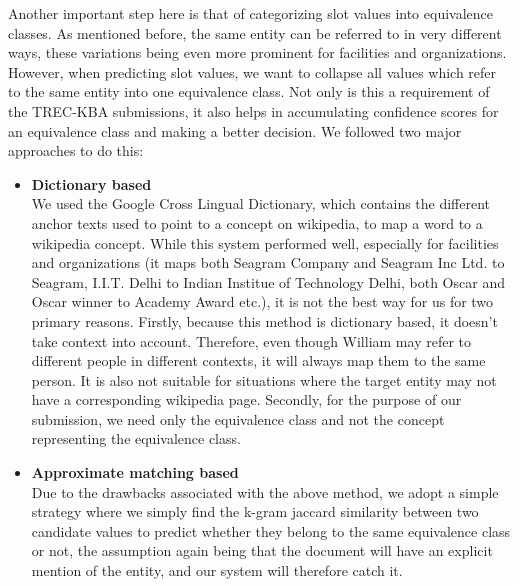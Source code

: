 Another important step here is that of categorizing slot values into equivalence classes. As mentioned before, the same entity can be referred to in very different ways, these variations being even more prominent for facilities and organizations. However, when predicting slot values, we want to collapse all values which refer to the same entity into one equivalence class. Not only is this a requirement of the TREC-KBA submissions, it also helps in accumulating confidence scores for an equivalence class and making a better decision. We followed two major approaches to do this:
\begin{itemize}
\item \textbf{Dictionary based}\\
We used the Google Cross Lingual Dictionary, which contains the different anchor texts used to point to a concept on wikipedia, to map a word to a wikipedia concept. While this system performed well, especially for facilities and organizations (it maps both Seagram Company and Seagram Inc Ltd. to Seagram, I.I.T. Delhi to Indian Institue of Technology Delhi, both Oscar and Oscar winner to Academy Award etc.), it is not the best way for us for two primary reasons. Firstly, because this method is dictionary based, it doesn’t take context into account. Therefore, even though William may refer to different people in different contexts, it will always map them to the same person. It is also not suitable for situations where the target entity may not have a corresponding wikipedia page. Secondly, for the purpose of our submission, we need only the equivalence class and not the concept representing the equivalence class.
\item \textbf{Approximate matching based} \\
Due to the drawbacks associated with the above method, we adopt a simple strategy where we simply find the k-gram jaccard similarity between two candidate values to predict whether they belong to the same equivalence class or not, the assumption again being that the document will have an explicit mention of the entity, and our system will therefore catch it.
\end{itemize}
